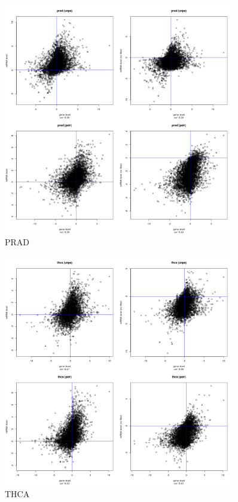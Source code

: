 \documentclass[a4paper,12pt]{article}
\begin{document}
\newpage

\begin{figure}[!h] 
\centering 
\includegraphics[width=0.9\textwidth]{plots/gene_vs_mirna_level_gsa_prad.png} 
\caption{PRAD} 
\end{figure} 

\newpage

\begin{figure}[!h] 
\centering 
\includegraphics[width=0.9\textwidth]{plots/gene_vs_mirna_level_gsa_thca.png} 
\caption{THCA} 
\end{figure} 
\end{document}
